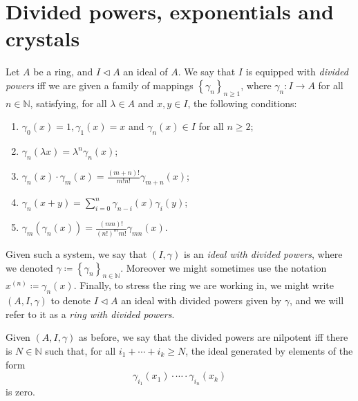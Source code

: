 \documentclass[../Main]{subfiles}
\begin{document}
\section{Divided powers, exponentials and crystals}
\begin{defn}\label{defn:dividedPowers}
	Let $A$ be a ring, and $I \triangleleft A$ an ideal of $A$.
	We say that $I$ is equipped with {\em divided powers} iff
	we are given a family of mappings $\left\{ \gamma_n \right\}_{n \geq 1}$,
	where $\gamma_n\colon I \to A$ for all $n \in \mathbb{N}$,
	satisfying, for all $\lambda \in A$ and $x,y \in I$, the following conditions:
	\begin{enumerate}
		\item $\gamma_0(x) = 1, \gamma_1(x) = x$ and 
			$\gamma_n(x) \in I$ for all $n \geq 2$;
		\item $\gamma_n(\lambda x) = \lambda^n \gamma_n(x)$;
		\item $\gamma_n(x) \cdot \gamma_m(x) =
			\frac{\left( m + n \right)!}{m! n!} \gamma_{m+n}(x)$;
		\item $\gamma_n(x+y) = \sum_{i=0}^{n} \gamma_{n-i}(x) \gamma_i(y)$;
		\item $\gamma_m(\gamma_n(x)) = 
			\frac{\left( mn \right)!}{\left( n! \right)^m m!} \gamma_{mn}(x)$.
	\end{enumerate}
	Given such a system, we say that $(I,\gamma)$
	is an {\em ideal with divided powers},
	where we denoted $\gamma \coloneqq \left\{ \gamma_n \right\}_{n \in \mathbb{N}}$.
	Moreover we might sometimes use the notation
	$x^{(n)} \coloneqq \gamma_n(x)$.
	Finally, to stress the ring we are working in, we might write
	$\left(A, I, \gamma\right)$ to denote $I \triangleleft A$
	an ideal with divided powers given by $\gamma$, and 
	we will refer to it as a {\em ring with divided powers}.
\end{defn}


\begin{defn}\label{defn:NilpotentDividedPowers}
	Given $\left(A, I, \gamma\right)$ as before, we say that the divided
	powers are nilpotent iff there is $N \in \mathbb{N}$ such that,
	for all $i_1 + \cdots + i_k \geq N$,
	the ideal generated by elements of the form
	\begin{equation*}
		\gamma_{i_1}(x_1) \cdot \cdots \cdot \gamma_{i_n}(x_k)
	\end{equation*}
	is zero.
\end{defn}
\end{document}
